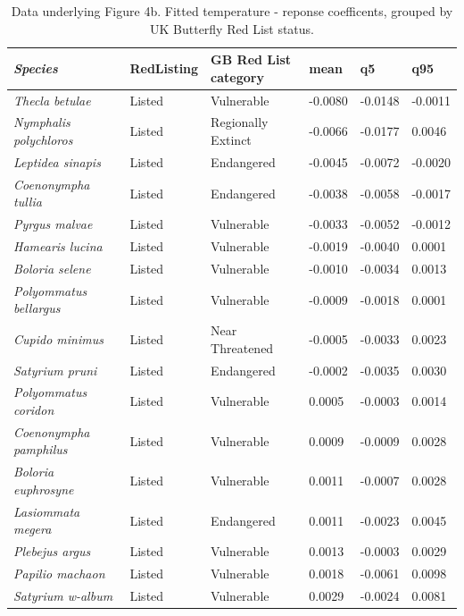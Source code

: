 \documentclass[a4paper,11pt]{article}
\begin{document}

\footnotesize
\begin{longtable}{@{}
  >{\itshape}p{0.30\linewidth}  %
  p{0.15\linewidth}  %
  p{0.25\linewidth}  %
  p{0.10\linewidth} %
    p{0.10\linewidth} %
     p{0.10\linewidth} %
 @{}}

\caption{Data underlying Figure 4b. Fitted temperature - reponse coefficents, grouped by UK Butterfly Red List status.}\\
\toprule
Species & RedListing & GB Red List category & mean & q5 & q95 \\
\midrule\noalign{}
\endhead
\bottomrule\noalign{}
\endlastfoot
Thecla betulae & Listed & Vulnerable & -0.0080 & -0.0148 & -0.0011 \\
Nymphalis polychloros & Listed & Regionally Extinct & -0.0066 & -0.0177
& 0.0046 \\
Leptidea sinapis & Listed & Endangered & -0.0045 & -0.0072 & -0.0020 \\
Coenonympha tullia & Listed & Endangered & -0.0038 & -0.0058 &
-0.0017 \\
Pyrgus malvae & Listed & Vulnerable & -0.0033 & -0.0052 & -0.0012 \\
Hamearis lucina & Listed & Vulnerable & -0.0019 & -0.0040 & 0.0001 \\
Boloria selene & Listed & Vulnerable & -0.0010 & -0.0034 & 0.0013 \\
Polyommatus bellargus & Listed & Vulnerable & -0.0009 & -0.0018 &
0.0001 \\
Cupido minimus & Listed & Near Threatened & -0.0005 & -0.0033 &
0.0023 \\
Satyrium pruni & Listed & Endangered & -0.0002 & -0.0035 & 0.0030 \\
Polyommatus coridon & Listed & Vulnerable & 0.0005 & -0.0003 & 0.0014 \\
Coenonympha pamphilus & Listed & Vulnerable & 0.0009 & -0.0009 &
0.0028 \\
Boloria euphrosyne & Listed & Vulnerable & 0.0011 & -0.0007 & 0.0028 \\
Lasiommata megera & Listed & Endangered & 0.0011 & -0.0023 & 0.0045 \\
Plebejus argus & Listed & Vulnerable & 0.0013 & -0.0003 & 0.0029 \\
Papilio machaon & Listed & Vulnerable & 0.0018 & -0.0061 & 0.0098 \\
Satyrium w-album & Listed & Vulnerable & 0.0029 & -0.0024 & 0.0081 \\

\end{longtable}
\end{document}
